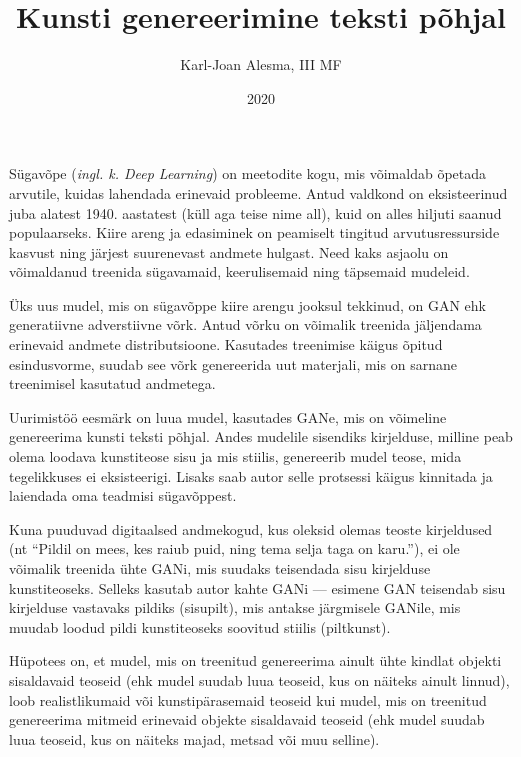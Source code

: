 \documentclass{vilgym}
\title{Kunsti genereerimine teksti põhjal}
\author{Karl-Joan Alesma, III MF}
\date{2020}
\begin{document}
	\maketitle
	\tableofcontents

	\newcommand*{\seefig}[1]{(\hyperref[fig:#1]{vt~joonis~\ref{fig:#1}})}
	\newcommand*{\inglk}[1]{(\textit{ingl. k. #1})}

	Sügavõpe \inglk{Deep Learning} on meetodite kogu, mis võimaldab õpetada arvutile, kuidas lahendada erinevaid probleeme. Antud valdkond on eksisteerinud juba alatest 1940. aastatest (küll aga teise nime all), kuid on alles hiljuti saanud populaarseks. Kiire areng ja edasiminek on peamiselt tingitud arvutusressurside kasvust ning järjest suurenevast andmete hulgast. Need kaks asjaolu on võimaldanud treenida sügavamaid, keerulisemaid ning täpsemaid mudeleid. \parencite{deeplearningbook}	 

	Üks uus mudel, mis on sügavõppe kiire arengu jooksul tekkinud, on GAN ehk generatiivne adverstiivne võrk. Antud võrku on võimalik treenida jäljendama erinevaid andmete distributsioone. Kasutades treenimise käigus õpitud esindusvorme, suudab see võrk genereerida uut materjali, mis on sarnane treenimisel kasutatud andmetega. \parencite{gan}

	Uurimistöö eesmärk on luua mudel, kasutades GANe, mis on võimeline genereerima kunsti teksti põhjal. Andes mudelile sisendiks kirjelduse, milline peab olema loodava kunstiteose sisu ja mis stiilis, genereerib mudel teose, mida tegelikkuses ei eksisteerigi. Lisaks saab autor selle protsessi käigus kinnitada ja laiendada oma teadmisi sügavõppest.

	Kuna puuduvad digitaalsed andmekogud, kus oleksid olemas teoste kirjeldused (nt \enquote{Pildil on mees, kes raiub puid, ning tema selja taga on karu.}), ei ole võimalik treenida ühte GANi, mis suudaks teisendada sisu kirjelduse kunstiteoseks. Selleks kasutab autor kahte GANi --- esimene GAN teisendab sisu kirjelduse vastavaks pildiks (sisu\textrightarrow pilt), mis antakse järgmisele GANile, mis muudab loodud pildi kunstiteoseks soovitud stiilis (pilt\textrightarrow kunst).

	Hüpotees on, et mudel, mis on treenitud genereerima ainult ühte kindlat objekti sisaldavaid teoseid (ehk mudel suudab luua teoseid, kus on näiteks ainult linnud), loob realistlikumaid või kunstipärasemaid teoseid kui mudel, mis on treenitud genereerima mitmeid erinevaid objekte sisaldavaid teoseid (ehk mudel suudab luua teoseid, kus on näiteks majad, metsad või muu selline).
\end{document}
